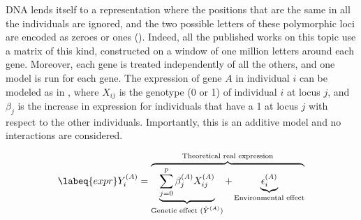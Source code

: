 \documentclass[../main.tex]{subfiles}
\begin{document}
DNA lends itself to a representation where the positions that are the 
same in all the individuals are ignored, and the two possible letters of 
these polymorphic loci are encoded as zeroes or ones 
(). Indeed, all the published works on this topic 
use a matrix of this kind, constructed on a window of one million 
letters around each gene. Moreover, each gene is treated independently 
of all the others, and one model is run for each gene. The expression of 
gene $A$ in individual $i$ can be modeled as in , where 
$X_{ij}$ is the genotype (0 or 1) of individual $i$ at locus $j$, and 
$\beta_j$ is the increase in expression for individuals that have a 1 at 
locus $j$ with respect to the other individuals. Importantly, this is an 
additive model and no interactions are considered.

\begin{equation}
  \labeq{expr}
  Y_i^{(A)} = \overbrace{\underbrace{\sum_{j=0}^p \beta_j^{(A)} X_{ij}^{(A)}}_{\text{Genetic effect ($\hat{Y}^{(A)}$)}} + \underbrace{\epsilon_i^{(A)}}_{\text{Environmental effect}}}^{\text{Theoretical real expression}}
\end{equation}
\end{document}
